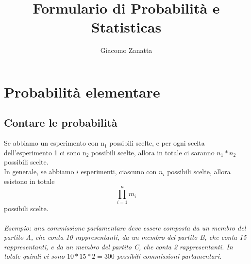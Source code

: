 \documentclass{article}
\title{Formulario di Probabilità e Statisticas}
\author{Giacomo Zanatta}
\begin{document}
\maketitle
\tableofcontents
\newpage
\section{Probabilità elementare}
\subsection{Contare le probabilità}
Se abbiamo un esperimento con n$_1$ possibili scelte, e per ogni scelta dell'esperimento 1 ci sono n$_2$ possibili scelte, allora in totale ci saranno $n_1*n_2$ possibili scelte.\\
In generale, se abbiamo $i$ esperimenti, ciascuno con $n_i$ possibili scelte, allora esistono in totale 
\begin{equation}
  \prod\limits_{i=1}^n m_i
\end{equation}
possibili scelte.\\ 
\\
\emph{
  Esempio: una commissione parlamentare deve essere composta da un membro del partito A, che conta 10 rappresentanti, da un membro del partito B, che conta 15 rappresentanti, e da un membro del   partito C, che conta 2 rappresentanti. In totale quindi ci sono $10*15*2 = 300$ possibili   commissioni parlamentari.
}
\\
\end{document}
